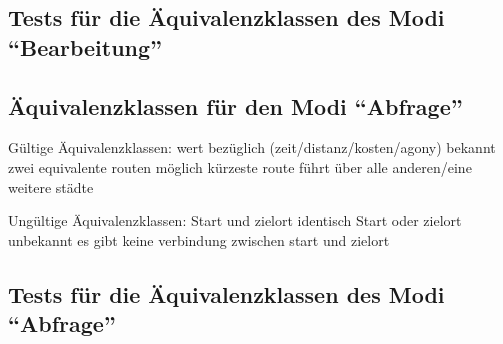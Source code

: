 \documentclass[a4paper]{report}
\begin{document}
\subsection*{Tests für die Äquivalenzklassen des Modi ``Bearbeitung''}

\subsection*{Äquivalenzklassen für den Modi ``Abfrage''}
Gültige Äquivalenzklassen:
wert bezüglich (zeit/distanz/kosten/agony) bekannt
zwei equivalente routen möglich
kürzeste route führt über alle anderen/eine weitere städte

Ungültige Äquivalenzklassen:
Start und zielort identisch
Start oder zielort unbekannt
es gibt keine verbindung zwischen start und zielort

\subsection*{Tests für die Äquivalenzklassen des Modi ``Abfrage''}

\end{document}

